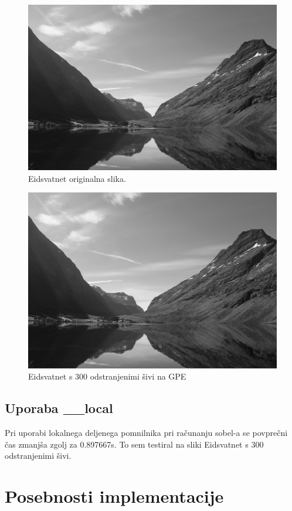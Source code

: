 \documentclass[11pt,a4paper]{article}
\begin{document}
\begin{figure}[htb]
\begin{center}
\includegraphics[width=0.6\columnwidth]{eidsvatnet_original.png}
\end{center}
\caption{Eidsvatnet originalna slika.}
\label{fig:eidsvatnet_original}
\end{figure}

\begin{figure}[htb]
\begin{center}
\includegraphics[width=0.6\columnwidth]{eidsvatnet_seam.png}
\end{center}
\caption{Eidsvatnet s 300 odstranjenimi šivi na GPE}
\label{fig:eidsvatnet_seam}
\end{figure}

\pagebreak

\subsection{Uporaba \_\_local}

Pri uporabi lokalnega deljenega pomnilnika pri računanju sobel-a se povprečni
čas zmanjša zgolj za 0.897667s. To sem testiral na sliki Eidsvatnet s 300
odstranjenimi šivi.

\section{Posebnosti implementacije}
\end{document}
